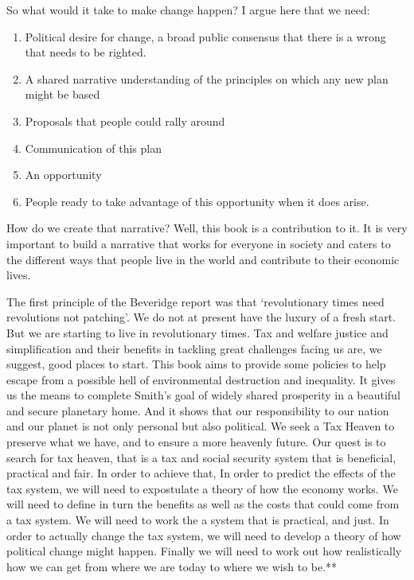 \documentclass[]{tufte-handout}
\providecommand{\tightlist}{%
  \setlength{\itemsep}{0pt}\setlength{\parskip}{0pt}}
\begin{document}
So what would it take to make change happen? I argue here that we need:

\begin{enumerate}
\def\labelenumi{\arabic{enumi}.}
\tightlist
\item
  Political desire for change, a broad public consensus that there is a
  wrong that needs to be righted.
\item
  A shared narrative understanding of the principles on which any new
  plan might be based
\item
  Proposals that people could rally around
\item
  Communication of this plan
\item
  An opportunity
\item
  People ready to take advantage of this opportunity when it does arise.
\end{enumerate}

How do we create that narrative? Well, this book is a contribution to
it. It is very important to build a narrative that works for everyone in
society and caters to the different ways that people live in the world
and contribute to their economic lives.

The first principle of the Beveridge report was that `revolutionary
times need revolutions not patching'. We do not at present have the
luxury of a fresh start. But we are starting to live in revolutionary
times. Tax and welfare justice and simplification and their benefits in
tackling great challenges facing us are, we suggest, good places to
start. This book aims to provide some policies to help escape from a
possible hell of environmental destruction and inequality. It gives us
the means to complete Smith's goal of widely shared prosperity in a
beautiful and secure planetary home. And it shows that our
responsibility to our nation and our planet is not only personal but
also political. We seek a Tax Heaven to preserve what we have, and to
ensure a more heavenly future. Our quest is to search for tax heaven,
that is a tax and social security system that is beneficial, practical
and fair. In order to achieve that, In order to predict the effects of
the tax system, we will need to expostulate a theory of how the economy
works. We will need to define in turn the benefits as well as the costs
that could come from a tax system. We will need to work the a system
that is practical, and just. In order to actually change the tax system,
we will need to develop a theory of how political change might happen.
Finally we will need to work out how realistically how we can get from
where we are today to where we wish to be.**
\end{document}
